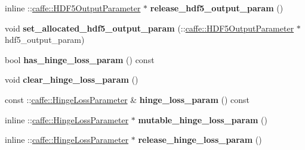 \begin{DoxyCompactItemize}
\item 
\mbox{\label{classcaffe_1_1_v1_layer_parameter_a148df151f61bc08c8765002f68439fb0}} 
inline \+::\mbox{\hyperlink{classcaffe_1_1_h_d_f5_output_parameter}{caffe\+::\+H\+D\+F5\+Output\+Parameter}} $\ast$ {\bfseries release\+\_\+hdf5\+\_\+output\+\_\+param} ()
\item 
\mbox{\label{classcaffe_1_1_v1_layer_parameter_afbdf19e8968fd7f05c21d4a07ab0b507}} 
void {\bfseries set\+\_\+allocated\+\_\+hdf5\+\_\+output\+\_\+param} (\+::\mbox{\hyperlink{classcaffe_1_1_h_d_f5_output_parameter}{caffe\+::\+H\+D\+F5\+Output\+Parameter}} $\ast$hdf5\+\_\+output\+\_\+param)
\item 
\mbox{\label{classcaffe_1_1_v1_layer_parameter_a8c02c39eef17c78b8f4288fe633eeca4}} 
bool {\bfseries has\+\_\+hinge\+\_\+loss\+\_\+param} () const
\item 
\mbox{\label{classcaffe_1_1_v1_layer_parameter_a6a83ecc6312de41cf4e241b7c6a67c86}} 
void {\bfseries clear\+\_\+hinge\+\_\+loss\+\_\+param} ()
\item 
\mbox{\label{classcaffe_1_1_v1_layer_parameter_aed7dda6f348b9eee37b38c214f09b229}} 
const \+::\mbox{\hyperlink{classcaffe_1_1_hinge_loss_parameter}{caffe\+::\+Hinge\+Loss\+Parameter}} \& {\bfseries hinge\+\_\+loss\+\_\+param} () const
\item 
\mbox{\label{classcaffe_1_1_v1_layer_parameter_a2efc048ab5b058dea30591dd49ee3320}} 
inline \+::\mbox{\hyperlink{classcaffe_1_1_hinge_loss_parameter}{caffe\+::\+Hinge\+Loss\+Parameter}} $\ast$ {\bfseries mutable\+\_\+hinge\+\_\+loss\+\_\+param} ()
\item 
\mbox{\label{classcaffe_1_1_v1_layer_parameter_a22d4c9897e7092e2042b060d4490c1c9}} 
inline \+::\mbox{\hyperlink{classcaffe_1_1_hinge_loss_parameter}{caffe\+::\+Hinge\+Loss\+Parameter}} $\ast$ {\bfseries release\+\_\+hinge\+\_\+loss\+\_\+param} ()
\item 
\mbox{\label{classcaffe_1_1_v1_layer_parameter_a8e48abc55f1f5831b63518bdc374aea0}} 

\end{DoxyCompactItemize}

